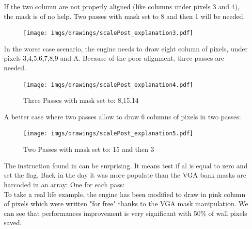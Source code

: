 If the two column are not properly aligned (like columns under pixels 3 and 4), the mask is of no help. Two passes with mask set to 8 and then 1 will be needed.
  \begin{figure}[H]
 \centering
 \texttt{[image: imgs/drawings/scalePost\_explanation3.pdf]}
 \end{figure}


In the worse case scenario, the engine needs to draw eight column of pixels, under pixels 3,4,5,6,7,8,9 and A. Because of the poor alignment, three passes are needed.
  \begin{figure}[H]
 \centering
 \texttt{[image: imgs/drawings/scalePost\_explanation4.pdf]}
 \caption{Three Passes with mask set to: 8,15,14}
 \end{figure}


A better case where two passes allow to draw 6 columns of pixels in two passes:
   \begin{figure}[H]
 \centering
 \texttt{[image: imgs/drawings/scalePost\_explanation5.pdf]}
  \caption{Two Passes with mask set to: 15 and then 3}
 \end{figure}


The instruction  found in  can be surprising. It means test if al is equal to zero and set the flag. Back in the day it was more populate than 
 the VGA bank masks are harcoded in an array: One for each pass:\\



To take a real life example, the engine has been modified to draw in pink column of pixels which were written "for free" thanks to the VGA mask manipulation. We can see that performances improvement is very significant with 50\% of wall pixels saved.

\begin{minipage}{\textwidth}

 \centering
\vspace*{0.5cm}

\end{minipage}



\par

